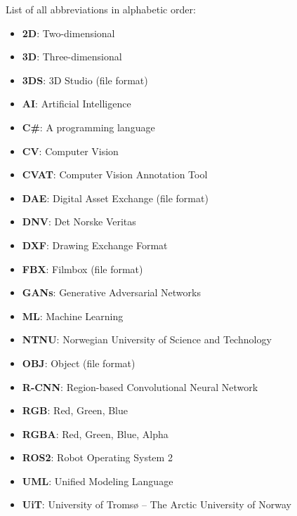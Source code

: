 
List of all abbreviations in alphabetic order:

\begin{itemize}

    \item \textbf{2D}: Two-dimensional
    \item \textbf{3D}: Three-dimensional
    \item \textbf{3DS}: 3D Studio (file format)
    \item \textbf{AI}: Artificial Intelligence
    \item \textbf{C\#}: A programming language
    \item \textbf{CV}: Computer Vision
    \item \textbf{CVAT}: Computer Vision Annotation Tool
    \item \textbf{DAE}: Digital Asset Exchange (file format)
    \item \textbf{DNV}: Det Norske Veritas
    \item \textbf{DXF}: Drawing Exchange Format
    \item \textbf{FBX}: Filmbox (file format)
    \item \textbf{GANs}: Generative Adversarial Networks
    \item \textbf{ML}: Machine Learning
    \item \textbf{NTNU}: Norwegian University of Science and Technology
    \item \textbf{OBJ}: Object (file format)
     \item \textbf{R-CNN}: Region-based Convolutional Neural Network
    \item \textbf{RGB}: Red, Green, Blue
    \item \textbf{RGBA}: Red, Green, Blue, Alpha
    \item \textbf{ROS2}: Robot Operating System 2
    \item \textbf{UML}: Unified Modeling Language
    \item \textbf{UiT}: University of Tromsø – The Arctic University of Norway
\end{itemize}
    
    